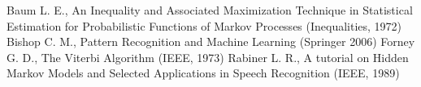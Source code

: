 \documentclass{article}
\begin{document}


\begin{thebibliography}{99}
 Baum L. E., An Inequality and Associated Maximization Technique in Statistical Estimation for Probabilistic Functions of Markov Processes (Inequalities, 1972)
 Bishop C. M., Pattern Recognition and Machine Learning (Springer 2006)
 Forney G. D., The Viterbi Algorithm (IEEE, 1973)
 Rabiner L. R., A tutorial on Hidden Markov Models and Selected Applications in Speech Recognition (IEEE, 1989)
\end{thebibliography}
\end{document}
